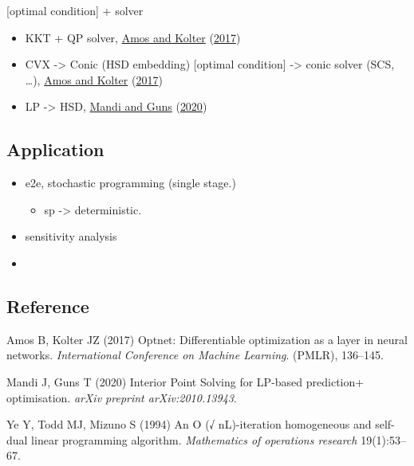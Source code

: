 \documentclass[
  10pt,
  a4paper,
,tablecaptionabove
]{scrartcl}
\providecommand{\tightlist}{%
  \setlength{\itemsep}{0pt}\setlength{\parskip}{0pt}}
\begin{document}
{[}optimal condition{]} + solver

\begin{itemize}
\tightlist
\item
  KKT + QP solver, \protect\hyperlink{ref-amos_optnet_2017}{Amos and
  Kolter} (\protect\hyperlink{ref-amos_optnet_2017}{2017})
\item
  CVX -\textgreater{} Conic (HSD embedding) {[}optimal condition{]}
  -\textgreater{} conic solver (SCS, \ldots),
  \protect\hyperlink{ref-amos_optnet_2017}{Amos and Kolter}
  (\protect\hyperlink{ref-amos_optnet_2017}{2017})
\item
  LP -\textgreater{} HSD,
  \protect\hyperlink{ref-mandi_interior_2020}{Mandi and Guns}
  (\protect\hyperlink{ref-mandi_interior_2020}{2020})
\end{itemize}

\hypertarget{application}{%
\subsection{Application}\label{application}}

\begin{itemize}
\tightlist
\item
  e2e, stochastic programming (single stage.)

  \begin{itemize}
  \tightlist
  \item
    sp -\textgreater{} deterministic.
  \end{itemize}
\item
  sensitivity analysis
\item
\end{itemize}

\hypertarget{reference}{%
\subsection{Reference}\label{reference}}

\hypertarget{refs}{}
\begin{CSLReferences}{1}{0}
\leavevmode\hypertarget{ref-amos_optnet_2017}{}%
Amos B, Kolter JZ (2017) Optnet: {Differentiable} optimization as a
layer in neural networks. \emph{International {Conference} on {Machine}
{Learning}}. (PMLR), 136--145.

\leavevmode\hypertarget{ref-mandi_interior_2020}{}%
Mandi J, Guns T (2020) Interior {Point} {Solving} for {LP}-based
prediction+ optimisation. \emph{arXiv preprint arXiv:2010.13943}.

\leavevmode\hypertarget{ref-ye_o_1994}{}%
Ye Y, Todd MJ, Mizuno S (1994) An {O} (√ {nL})-iteration homogeneous and
self-dual linear programming algorithm. \emph{Mathematics of operations
research} 19(1):53--67.

\end{CSLReferences}
\end{document}

